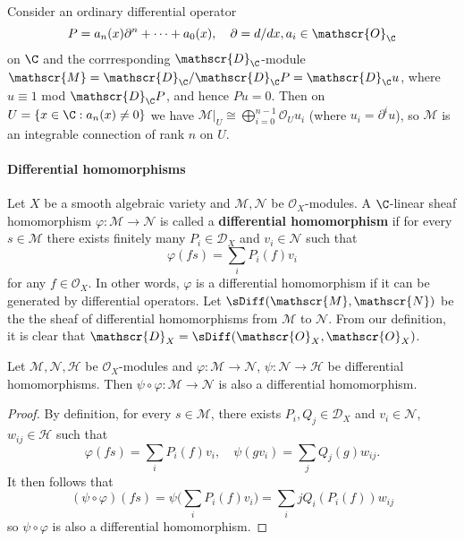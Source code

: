 \begin{example}
Consider an ordinary differential operator
\[P=a_n(x)\partial^n+\cdots+a_0(x),\quad \partial=d/dx,a_i\in\mathscr{O}_\C\]
on $\C$ and the corrresponding $\mathscr{D}_\C$-module $\mathscr{M}=\mathscr{D}_\C/\mathscr{D}_\C P=\mathscr{D}_\C u$, where $u\equiv 1$ mod $\mathscr{D}_\C P$, and hence $Pu=0$. Then on $U=\{x\in\C:a_n(x)\neq 0\}$ we have $\mathscr{M}|_U\cong\bigoplus_{i=0}^{n-1}\mathscr{O}_Uu_i$ (where $u_i=\partial^iu$), so $\mathscr{M}$ is an integrable connection of rank $n$ on $U$. 
\end{example}
\paragraph{Differential homomorphisms}
Let $X$ be a smooth algebraic variety and $\mathscr{M},\mathscr{N}$ be $\mathscr{O}_X$-modules. A $\C$-linear sheaf homomorphism $\varphi:\mathscr{M}\to\mathscr{N}$ is called a \textbf{differential homomorphism} if for every $s\in\mathscr{M}$ there exists finitely many $P_i\in\mathscr{D}_X$ and $v_i\in\mathscr{N}$ such that
\[\varphi(fs)=\sum_iP_i(f)v_i\]
for any $f\in\mathscr{O}_X$. In other words, $\varphi$ is a differential homomorphism if it can be generated by differential operators. Let $\sDiff(\mathscr{M},\mathscr{N})$ be the the sheaf of differential homomorphisms from $\mathscr{M}$ to $\mathscr{N}$. From our definition, it is clear that $\mathscr{D}_X=\sDiff(\mathscr{O}_X,\mathscr{O}_X)$.

\begin{lemma}\label{D-module differential homomorphism composition}
Let $\mathscr{M},\mathscr{N},\mathscr{H}$ be $\mathscr{O}_X$-modules and $\varphi:\mathscr{M}\to\mathscr{N}$, $\psi:\mathscr{N}\to\mathscr{H}$ be differential homomorphisms. Then $\psi\circ\varphi:\mathscr{M}\to\mathscr{N}$ is also a differential homomorphism.
\end{lemma}
\begin{proof}
By definition, for every $s\in\mathscr{M}$, there exists $P_i,Q_j\in\mathscr{D}_X$ and $v_i\in\mathscr{N}$, $w_{ij}\in\mathscr{H}$ such that
\[\varphi(fs)=\sum_iP_i(f)v_i,\quad \psi(gv_i)=\sum_jQ_j(g)w_{ij}.\]
It then follows that
\[(\psi\circ\varphi)(fs)=\psi\Big(\sum_iP_i(f)v_i\Big)=\sum_ijQ_i(P_i(f))w_{ij}\]
so $\psi\circ\varphi$ is also a differential homomorphism.
\end{proof}

